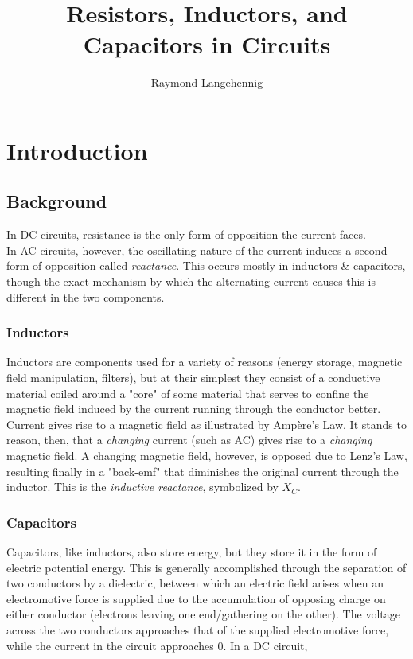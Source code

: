 \documentclass{article}
\title{Resistors, Inductors, and Capacitors in Circuits}
\author{Raymond Langehennig}
\begin{document}
\maketitle

	\section{Introduction}
		\subsection{Background}
			In DC circuits, resistance is the only form of opposition the current faces.\\
			In AC circuits, however, the oscillating nature of the current induces a second form of opposition called \emph{reactance}. This occurs mostly in inductors \& capacitors, though the exact mechanism by which the alternating current causes this is different in the two components.
			
			\subsubsection*{Inductors}
				Inductors are components used for a variety of reasons (energy storage, magnetic field manipulation, filters), but at their simplest they consist of a conductive material coiled around a "core" of some material that serves to confine the magnetic field induced by the current running through the conductor better.\\
				Current gives rise to a magnetic field as illustrated by Amp\`ere's Law. It stands to reason, then, that a \emph{changing} current (such as AC) gives rise to a \emph{changing} magnetic field. A changing magnetic field, however, is opposed due to Lenz's Law, resulting finally in a "back-emf" that diminishes the original current through the inductor. This is the \emph{inductive reactance}, symbolized by $X_C$.

			\subsubsection*{Capacitors}
				Capacitors, like inductors, also store energy, but they store it in the form of electric potential energy. This is generally accomplished through the separation of two conductors by a dielectric, between which an electric field arises when an electromotive force is supplied due to the accumulation of opposing charge on either conductor (electrons leaving one end/gathering on the other).
				The voltage across the two conductors approaches that of the supplied electromotive force, while the current in the circuit approaches 0. 
				In a DC circuit,
\end{document}

